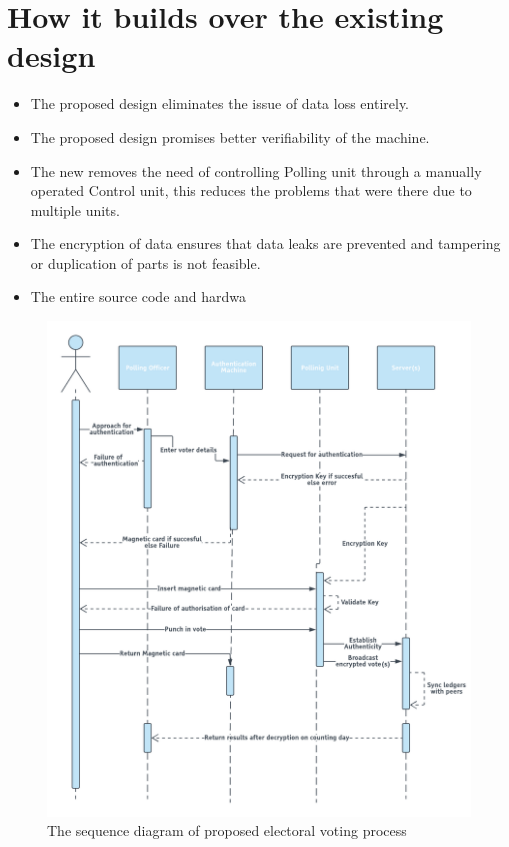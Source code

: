 \documentclass[a4paper,12pt,openany]{book}
\begin{document}
\section{How it builds over the existing design}
\begin{itemize}
\item The proposed design eliminates the issue of data loss entirely.

\item The proposed design promises better verifiability of the machine.

\item The new removes the need of controlling Polling unit through a manually operated Control unit, this reduces the problems that were there due to multiple units.

\item The encryption of data ensures that data leaks are prevented and tampering or duplication of parts is not feasible.

\item The entire source code and hardwa

\end{itemize}
\newpage
\begin{figure}[!hb]
\centering
\includegraphics[scale=0.38]{seq_diagram.PNG}
\caption{The sequence diagram of proposed electoral voting process}
\end{figure}
\newpage
\end{document}
